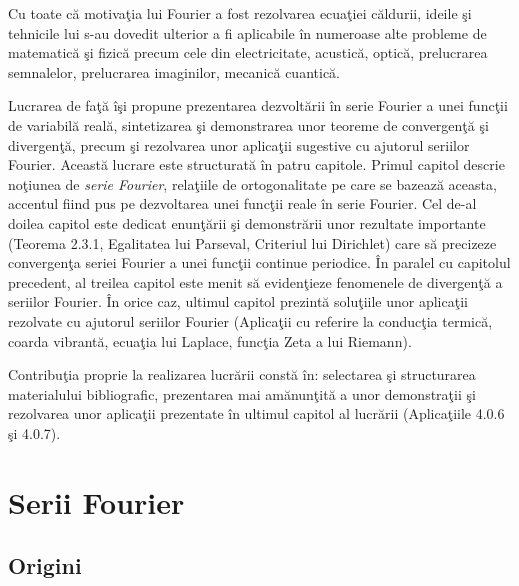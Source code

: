 \documentclass[a4paper,openany,12pt]{report}
\begin{document}
Cu toate c\u a motiva\c tia lui Fourier a fost rezolvarea ecua\c tiei c\u aldurii, ideile \c si tehnicile lui s-au dovedit ulterior a fi aplicabile \^ in numeroase alte probleme de matematic\u a \c si fizic\u a precum cele din electricitate, acustic\u a, optic\u a, prelucrarea semnalelor, prelucrarea imaginilor, mecanic\u a cuantic\u a.


Lucrarea de fa\c t\u a \^ i\c si propune prezentarea dezvolt\u arii \^ in serie Fourier a unei func\c tii de variabil\u a real\u a, sintetizarea \c si demonstrarea unor teoreme de convergen\c t\u a \c si divergen\c t\u a, precum \c si rezolvarea unor aplica\c tii sugestive cu ajutorul seriilor Fourier. Aceast\u a lucrare este structurat\u a \^ in patru capitole. Primul capitol descrie no\c tiunea de \textit{serie Fourier}, rela\c tiile de ortogonalitate pe care se bazeaz\u a aceasta, accentul fiind pus pe dezvoltarea unei func\c tii reale \^ in serie Fourier. Cel de-al doilea capitol este dedicat enun\c t\u arii \c si demonstr\u arii unor rezultate importante (Teorema 2.3.1, Egalitatea lui Parseval, Criteriul lui Dirichlet) care s\u a precizeze convergen\c ta seriei Fourier a unei func\c tii continue periodice. \^ In paralel cu capitolul precedent, al treilea capitol este menit s\u a eviden\c tieze fenomenele de divergen\c t\u a a seriilor Fourier. \^ In orice caz, ultimul capitol prezint\u a solu\c tiile unor aplica\c tii rezolvate cu ajutorul seriilor Fourier (Aplica\c tii cu referire la conduc\c tia termic\u a, coarda vibrant\u a, ecua\c tia lui Laplace, func\c tia Zeta a lui Riemann). 


Contribu\c tia proprie la realizarea lucr\u arii const\u a \^ in: selectarea \c si structurarea materialului bibliografic, prezentarea mai am\u anun\c tit\u a a unor demonstra\c tii \c si rezolvarea unor aplica\c tii prezentate \^ in ultimul capitol al lucr\u arii (Aplica\c tiile 4.0.6 \c si 4.0.7).



\chapter{Serii Fourier}
\section{Origini}
\end{document}
